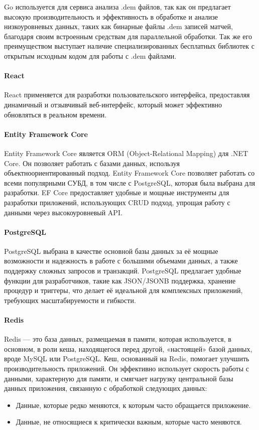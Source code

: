 Go используется для сервиса анализа .dem файлов, так как он предлагает высокую производительность и эффективность в обработке и анализе низкоуровневых данных, таких как  бинарные файлы .dem записей матчей, благодаря своим встроенным средствам для параллельной обработки. Так же его преимуществом выступает наличие специализированных бесплатных библиотек с открытым исходным кодом для работы с .dem файлами.

\paragraph{React}

React применяется для разработки пользовательского интерфейса, предоставляя динамичный и отзывчивый веб-интерфейс, который может эффективно обновляться в реальном времени.

\paragraph{Entity Framework Core}

Entity Framework Core является ORM (Object-Relational Mapping) для
.NET Core. Он позволяет работать с базами данных, используя объектноориентированный подход. Entity Framework Core позволяет работать со всеми популярными СУБД, в том числе с PostgreSQL, которая была выбрана для разработки. EF Core предоставляет удобные и мощные инструменты для разработки приложений, использующих CRUD подход, упрощая работу с данными через высокоуровневый API.

\paragraph{PostgreSQL}

PostgreSQL выбрана в качестве основной базы данных за её мощные возможности и надежность в работе с большими объемами данных, а также поддержку сложных запросов и транзакций. PostgreSQL предлагает удобные функции для разработчиков, такие как JSON/JSONB поддержка, хранение процедур и триггеры, что делает её идеальной для комплексных приложений,
требующих масштабируемости и гибкости.

\paragraph{Redis}

Redis — это база данных, размещаемая в памяти, которая используется, в основном, в роли кеша, находящегося перед другой, «настоящей» базой данных, вроде MySQL или PostgreSQL. Кеш, основанный на Redis, помогает улучшить производительность приложений. Он эффективно использует скорость работы с данными, характерную для памяти, и смягчает нагрузку центральной базы данных приложения, связанную с обработкой следующих данных:
\begin{itemize}
	\item Данные, которые редко меняются, к которым часто обращается приложение.
	\item Данные, не относящиеся к критически важным, которые часто меняются.
\end{itemize}

